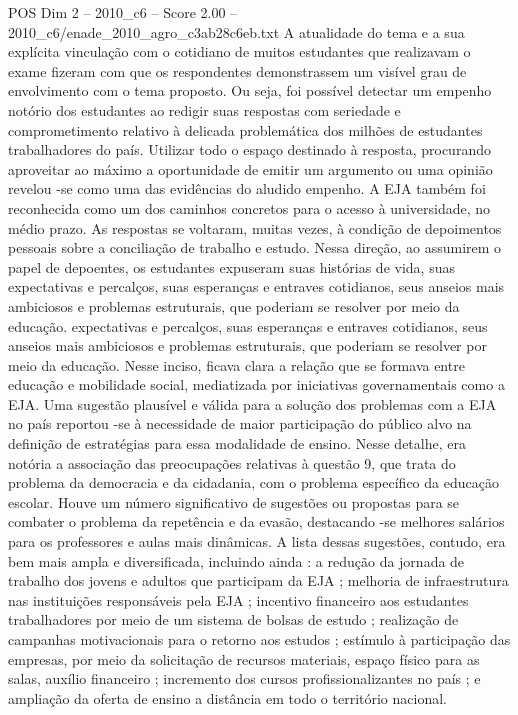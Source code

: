 \begin{textsample}{POS Dim 2 – 2010\_c6 – Score 2.00 – 2010\_c6/enade\_2010\_agro\_c3ab28c6eb.txt}
A atualidade do tema e a sua explícita vinculação com o cotidiano de muitos estudantes que realizavam o exame fizeram com que os respondentes demonstrassem um visível grau de envolvimento com o tema proposto.
Ou seja, foi possível detectar um empenho notório dos estudantes ao redigir suas respostas com seriedade e comprometimento relativo à delicada problemática dos milhões de estudantes trabalhadores do país.
Utilizar todo o espaço destinado à resposta, procurando aproveitar ao máximo a oportunidade de emitir um argumento ou uma opinião revelou -se como uma das evidências do aludido empenho.
A EJA também foi reconhecida como um dos caminhos concretos para o acesso à universidade, no médio prazo.
As respostas se voltaram, muitas vezes, à condição de depoimentos pessoais sobre a conciliação de trabalho e estudo.
Nessa direção, ao assumirem o papel de depoentes, os estudantes expuseram suas histórias de vida, suas expectativas e percalços, suas esperanças e entraves cotidianos, seus anseios mais ambiciosos e problemas estruturais, que poderiam se resolver por meio da educação. expectativas e percalços, suas esperanças e entraves cotidianos, seus anseios mais ambiciosos e problemas estruturais, que poderiam se resolver por meio da educação.
Nesse inciso, ficava clara a relação que se formava entre educação e mobilidade social, mediatizada por iniciativas governamentais como a EJA.
Uma sugestão plausível e válida para a solução dos problemas com a EJA no país reportou -se à necessidade de maior participação do público alvo na definição de estratégias para essa modalidade de ensino.
Nesse detalhe, era notória a associação das preocupações relativas à questão 9, que trata do problema da democracia e da cidadania, com o problema específico da educação escolar.
Houve um número significativo de sugestões ou propostas para se combater o problema da repetência e da evasão, destacando -se melhores salários para os professores e aulas mais dinâmicas.
A lista dessas sugestões, contudo, era bem mais ampla e diversificada, incluindo ainda : a redução da jornada de trabalho dos jovens e adultos que participam da EJA ; melhoria de infraestrutura nas instituições responsáveis pela EJA ; incentivo financeiro aos estudantes trabalhadores por meio de um sistema de bolsas de estudo ; realização de campanhas motivacionais para o retorno aos estudos ; estímulo à participação das empresas, por meio da solicitação de recursos materiais, espaço físico para as salas, auxílio financeiro ; incremento dos cursos profissionalizantes no país ; e ampliação da oferta de ensino a distância em todo o território nacional.

\end{textsample}
